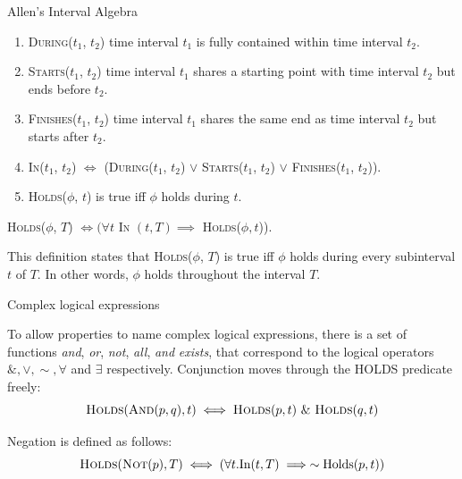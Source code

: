 
\begin{exmp} Allen's Interval Algebra

	\begin{enumerate}
		\item \textsc{During}($t_1$, $t_2$) time interval $t_1$ is fully contained within time interval $t_2$.

		\item \textsc{Starts}($t_1$, $t_2$) time interval $t_1$ shares a starting point with time interval $t_2$ but ends before $t_2$.

		\item \textsc{Finishes}($t_1$, $t_2$) time interval $t_1$ shares the same end as time interval $t_2$ but starts after $t_2$.

		\item \textsc{In}($t_1$, $t_2$) $\iff$ (\textsc{During}($t_1$, $t_2$) $\lor$ \textsc{Starts}($t_1$, $t_2$) $\lor$ \textsc{Finishes}($t_1$, $t_2$)).

		\item \textsc{Holds}(\(\phi\), \(t\)) is true iff \(\phi\) holds during \(t\).
	\end{enumerate}



	\begin{center}
		\textsc{Holds}(\(\phi\), \(T\)) \(\iff ( \forall t \) \textsc{In} $ (t,T) \implies $ \textsc{Holds}($\phi, t$)).
	\end{center}

	This definition states that \textsc{Holds}($\phi$, $T$) is true iff $\phi$ holds during every subinterval $t$ of $T$. In other words, $\phi$ holds throughout the interval $T$.
\end{exmp}

\begin{exmp} Complex logical expressions

	To allow properties to name complex logical expressions, there is a set of
	functions \textit{and}, \textit{or}, \textit{not}, \textit{all}, \textit{and} \textit{exists}, that correspond to the logical operators
	$\&, \lor, \sim, \forall$ and $\exists$ respectively.
	Conjunction moves through the HOLDS predicate freely:
	\begin{equation}
		\textsc{Holds}(\textsc{And}(p, q), t) \iff \textsc{Holds}(p, t) \  \& \  \textsc{Holds}(q, t)
	\end{equation}

	Negation is defined as follows:
	\begin{equation}
		\textsc{Holds}(\textsc{Not}(p), T) \iff (\forall t.\text{In}(t, T) \implies \sim \text{Holds}(p, t))
	\end{equation}
\end{exmp}




